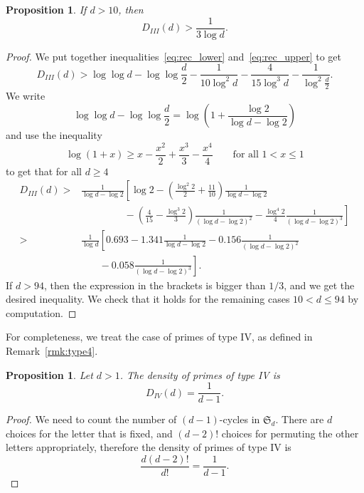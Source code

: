 \documentclass[11pt]{article}
\theoremstyle{plain}
\newtheorem{proposition}[theorem]{Proposition}
\theoremstyle{definition}
\theoremstyle{remark}
\numberwithin{equation}{section}
\renewcommand{\SS}{\mathfrak{S}}
\begin{document}
\begin{proposition}\label{prop:type3}
  If $d>10$, then
  \begin{equation*}
    D_{III}(d)>\frac{1}{3\log d}.
  \end{equation*}
\end{proposition}
\begin{proof}
  We put together inequalities~\eqref{eq:rec_lower} and~\eqref{eq:rec_upper}
  to get
  \begin{equation*}
    D_{III}(d)>\log\log d-\log\log\frac{d}{2}-\frac{1}{10\log^2 d}
    -\frac{4}{15\log^3 d}-\frac{1}{\log^2\frac{d}{2}}.
  \end{equation*}
  We write
  \begin{equation*}
    \log\log d - \log\log\frac{d}{2} =\log\left(1+\frac{\log 2}{\log d-\log
    2}\right)
  \end{equation*}
  and use the inequality
  \begin{equation*}
    \log(1+x)\geq x-\frac{x^2}{2}+\frac{x^3}{3}-\frac{x^4}{4}
    \qquad\text{for all }1<x\leq 1
  \end{equation*}
  to get that for all $d\geq 4$
  \begin{align*}
    D_{III}(d)>&\frac{1}{\log d-\log 2}\left[
      \log 2
      -\left(\frac{\log^2 2}{2}+\frac{11}{10}\right)\frac{1}{\log d-\log
      2}\right.\\
      &\left.\phantom{\frac{1}{\log d-\log 2}} 
      -\left(\frac{4}{15}-\frac{\log^3 2}{3}\right)\frac{1}{(\log d-\log 2)^2}
      -\frac{\log^4 2}{4}\frac{1}{(\log d-\log 2)^3}
      \right]\\
      >&\frac{1}{\log d}\left[
      0.693-1.341\frac{1}{\log d-\log 2}
      -0.156\frac{1}{(\log d-\log 2)^2}\right.\\
      &\left.\phantom{\frac{1}{\log d}}
      -0.058\frac{1}{(\log d-\log 2)^3}
      \right].
  \end{align*}
  If $d>94$, then the expression in the brackets is bigger than $1/3$, and we
  get the desired inequality.  We check that it holds for the remaining cases
  $10<d\leq 94$ by computation.
\end{proof}

For completeness, we treat the case of primes of type IV, as defined in
Remark~\ref{rmk:type4}.

\begin{proposition}\label{prop:type4}
  Let $d>1$.  The density of primes of type IV is
  \begin{equation*}
    D_{IV}(d)=\frac{1}{d-1}.
  \end{equation*}
\end{proposition}
\begin{proof}
  We need to count the number of $(d-1)$-cycles in $\SS_d$.  There are $d$
  choices for the letter that is fixed, and $(d-2)!$ choices for permuting the
  other letters appropriately, therefore the density of primes of type IV is
  \begin{equation*}
    \frac{d(d-2)!}{d!}=\frac{1}{d-1}.
  \end{equation*}
\end{proof}
\end{document}
